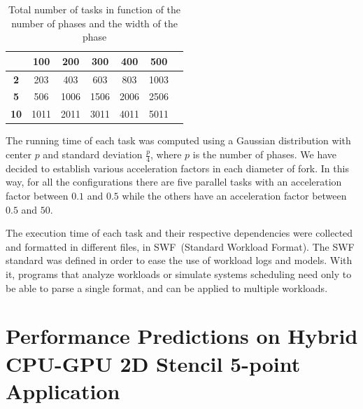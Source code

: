 \begin{table}[htpb]
\begin{center}
\begin{tabular}{|c|c|c|c|c|c|c|}
	\hline
	\backslashbox{\bf Nb$\_$phases}{\bf Diameter} & {\bf 100} & {\bf 200} & {\bf 300} & {\bf 400} & {\bf 500} \\
	\hline
	{\bf 2} & 203 & 403 & 603 & 803 & 1003 \\
	\hline
	{\bf 5} & 506 & 1006 & 1506 & 2006 & 2506 \\
	\hline
	{\bf 10} & 1011 & 2011 & 3011 & 4011 & 5011 \\
	\hline
\end{tabular}
\caption{Total number of tasks in function of the number of phases and the width of the phase}
\label{fig:nb_tasksFork}
\end{center}
\end{table}
The running time of each task was computed using a Gaussian distribution with center $p$ and standard deviation $\frac{p}{4}$, where $p$ is the number of phases. We have decided to establish various acceleration factors in each diameter of fork. In this way, for all the configurations there are five parallel tasks with an acceleration factor between $0.1$ and $0.5$ while the others have an acceleration factor between $0.5$ and $50$.

The execution time of each task and their respective dependencies were collected and formatted in different files, in SWF~(Standard Workload Format). The SWF standard was defined in order to ease the use of workload logs and models. With it, programs that analyze workloads or simulate systems scheduling need only to be able to parse a single format, and can be applied to multiple workloads.



\section{Performance Predictions on Hybrid CPU-GPU 2D Stencil 5-point Application}













